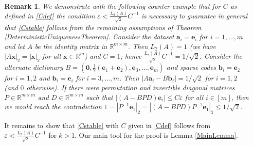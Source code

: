 \documentclass[journal, twocolumn]{IEEEtran}
\newtheorem{remark}{Remark}
\begin{document}
\begin{remark}
We demonstrate with the following counter-example that for $C$ as defined in \eqref{Cdef} the condition $\varepsilon < \frac{L_2(A)}{\sqrt{2}}C^{-1}$ is necessary to guarantee in general that \eqref{Cstable} follows from the remaining assumptions of Theorem \ref{DeterministicUniquenessTheorem}. Consider the dataset $\mathbf{a}_i = \mathbf{e}_i$ for $i = 1, \ldots, m$ and let $A$ be the identity matrix in $\mathbb{R}^{m \times m}$. Then $L_2(A) = 1$ (we have $|A\mathbf{x}|_2 = |\mathbf{x}|_2$ for all $\mathbf{x} \in \mathbb{R}^m$) and $C = 1$; hence $\frac{L_2(A)}{\sqrt{2}}C^{-1} = 1/\sqrt{2}$. Consider the alternate dictionary $B = \left(\mathbf{0}, \frac{1}{2}(\mathbf{e}_1 + \mathbf{e}_2), \mathbf{e}_3, \ldots, \mathbf{e}_{m} \right)$ and sparse codes $\mathbf{b}_i = \mathbf{e}_2$ for $i = 1, 2$ and $\mathbf{b}_i = \mathbf{e}_i$ for $i = 3, \ldots, m$. Then $|A\mathbf{a}_i - B\mathbf{b}_i| = 1/\sqrt{2}$ for $i = 1, 2$ (and $0$ otherwise). If there were permutation and invertible diagonal matrices $P \in \mathbb{R}^{m \times m}$ and $D \in \mathbb{R}^{m \times m}$ such that $|(A-BPD)\mathbf{e}_i| \leq C\varepsilon$ for all $i \in [m]$, then we would reach the contradiction $1 = |P^{-1}\mathbf{e}_1|_2 = |(A-BPD)P^{-1}\mathbf{e}_1|_2 \leq 1/\sqrt{2}$. 
\end{remark}

It remains to show that \eqref{Cstable} with $C$ given in \eqref{Cdef} follows from $\varepsilon < \frac{L_2(A)}{\sqrt{2}}C^{-1}$ for $k > 1$. Our main tool for the proof is Lemma \ref{MainLemma}.
\end{document}
